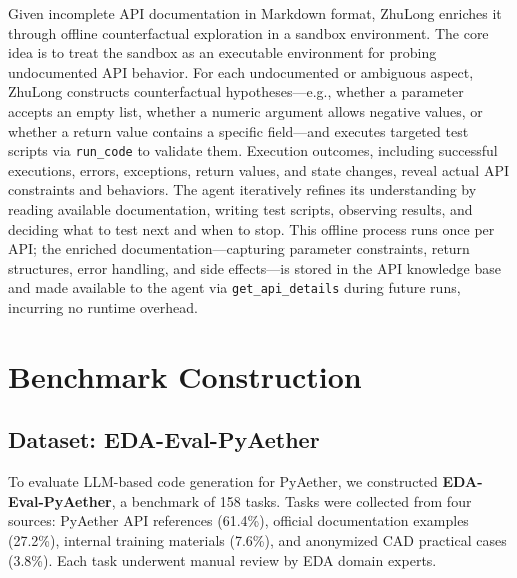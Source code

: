 \documentclass[anonymous, sigconf]{acmart}
\begin{document}
Given incomplete API documentation in Markdown format, ZhuLong enriches it through offline counterfactual exploration in a sandbox environment. The core idea is to treat the sandbox as an executable environment for probing undocumented API behavior. For each undocumented or ambiguous aspect, ZhuLong constructs counterfactual hypotheses—e.g., whether a parameter accepts an empty list, whether a numeric argument allows negative values, or whether a return value contains a specific field—and executes targeted test scripts via \texttt{run\_code} to validate them. Execution outcomes, including successful executions, errors, exceptions, return values, and state changes, reveal actual API constraints and behaviors. The agent iteratively refines its understanding by reading available documentation, writing test scripts, observing results, and deciding what to test next and when to stop. This offline process runs once per API; the enriched documentation—capturing parameter constraints, return structures, error handling, and side effects—is stored in the API knowledge base and made available to the agent via \texttt{get\_api\_details} during future runs, incurring no runtime overhead.

\section{Benchmark Construction}
\label{sec:benchmark}

\subsection{Dataset: EDA-Eval-PyAether}

To evaluate LLM-based code generation for PyAether, we constructed \textbf{EDA-Eval-PyAether}, a benchmark of 158 tasks. Tasks were collected from four sources: PyAether API references (61.4\%), official documentation examples (27.2\%), internal training materials (7.6\%), and anonymized CAD practical cases (3.8\%). Each task underwent manual review by EDA domain experts.
\end{document}
